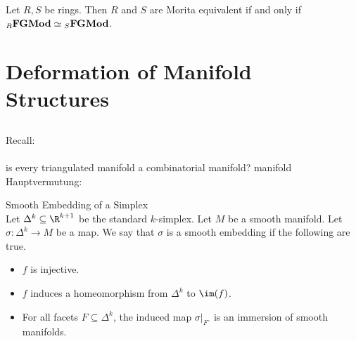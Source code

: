 \documentclass[a4paper]{article}
\begin{document}
\begin{prp}{}{}\\
Let $R,S$ be rings. Then $R$ and $S$ are Morita equivalent if and only if ${_R}\bold{FGMod}\simeq{_S}\bold{FGMod}$. 
\end{prp}

\pagebreak
\section{Deformation of Manifold Structures}
\subsection{}
Recall: \\
\\

is every triangulated manifold a combinatorial manifold?
manifold Hauptvermutung: 


\begin{defn}{Smooth Embedding of a Simplex}{}\\
Let $\Delta^k\subseteq\R^{k+1}$ be the standard $k$-simplex. Let $M$ be a smooth manifold. Let $\sigma:\Delta^k\to M$ be a map. We say that $\sigma$ is a smooth embedding if the following are true. 
\begin{itemize}
\item $f$ is injective. 
\item $f$ induces a homeomorphism from $\Delta^k$ to $\im(f)$. 
\item For all facets $F\subseteq\Delta^k$, the induced map $\sigma|_{F^\circ}$ is an immersion of smooth manifolds. 
\end{itemize}
\end{defn}
\end{document}
